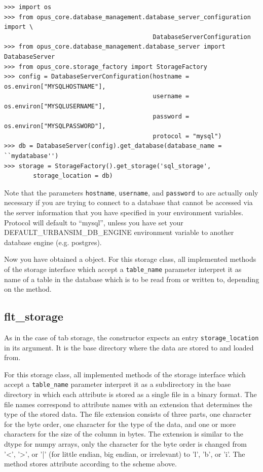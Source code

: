 {\begin{verbatim}
>>> import os
>>> from opus_core.database_management.database_server_configuration import \
                                         DatabaseServerConfiguration
>>> from opus_core.database_management.database_server import DatabaseServer
>>> from opus_core.storage_factory import StorageFactory
>>> config = DatabaseServerConfiguration(hostname = os.environ["MYSQLHOSTNAME"],
                                         username = os.environ["MYSQLUSERNAME"],
                                         password = os.environ["MYSQLPASSWORD"],
                                         protocol = "mysql")
>>> db = DatabaseServer(config).get_database(database_name = ``mydatabase'')
>>> storage = StorageFactory().get_storage('sql_storage',
        storage_location = db)
\end{verbatim}

Note that the parameters \verb|hostname|, \verb|username|, and
\verb|password| to  are actually only
necessary if you are trying to connect to a database that cannot be accessed via the server
information that you have specified in your environment variables. Protocol
will default to ``mysql'', unless you have set your DEFAULT_URBANSIM_DB_ENGINE
environment variable to another database engine (e.g. postgres). 

Now you have obtained a  object. For this storage class,
all implemented methods of the storage interface which accept a \verb|table_name| parameter interpret it as
name of a table in the database which is to be read from or written to,
depending on the method.

\subsection{flt_storage}
\label{sec:flt-storage}
%
As in the case of tab storage, the constructor expects an entry
\verb|storage_location| in its argument. It is the base
directory where the data are stored to and loaded from.

For this storage class, all implemented methods of the storage interface which
accept a \verb|table_name| parameter interpret it as a subdirectory in the base
directory in which each attribute is stored as a single file in a binary format.
The file names correspond to attribute names with an extension that determines
the type of the stored data. The file extension consists of three parts, one
character for the byte order, one character for the type of the data, and one or
more characters for the size of the column in bytes. The extension is similar to
the dtype for numpy arrays, only the character for the byte order is changed from
'<', '>', or '|' (for little endian, big endian, or irrelevant) to 'l', 'b', or
'i'. The method \method{write_table()} stores attribute according to the scheme
above.

}
